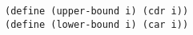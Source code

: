 \documentclass[a4paper,12pt]{article}
\begin{document}
\begin{lstlisting}
(define (upper-bound i) (cdr i))
(define (lower-bound i) (car i))
\end{lstlisting}
\end{document}
